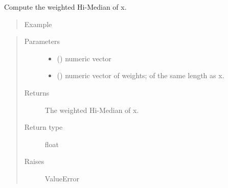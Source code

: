\documentclass[letterpaper,10pt,english]{sphinxmanual}
\begin{document}

\begin{fulllineitems}
\label{\detokenize{_modules/lmrob:lmrob.utils.wgtHighMedian}}
Compute the weighted Hi-Median of x.
\begin{quote}\begin{description}
\item[{Example}] \leavevmode
\end{description}\end{quote}

%
\begin{sphinxVerbatim}[commandchars=\\\{\}]
\PYG{p}{[}\PYG{p}{]}        
\end{sphinxVerbatim}
\begin{quote}\begin{description}
\item[{Parameters}] \leavevmode\begin{itemize}
\item {} 
 () \textendash{} numeric vector

\item {} 
 () \textendash{} numeric vector of weights; of the same length as x.

\end{itemize}

\item[{Returns}] \leavevmode
The weighted Hi-Median of x.

\item[{Return type}] \leavevmode
float

\item[{Raises}] \leavevmode
ValueError

\end{description}\end{quote}

\end{fulllineitems}
\end{document}
